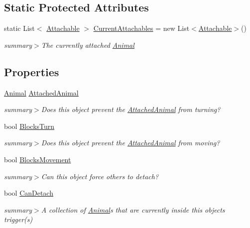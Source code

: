 \subsection*{Static Protected Attributes}
\begin{DoxyCompactItemize}
\item 
static List$<$ \mbox{\hyperlink{class_attachable}{Attachable}} $>$ \mbox{\hyperlink{class_attachable_a0dd1e27d821e792b4ec611836053ea86}{Current\+Attachables}} = new List$<$\mbox{\hyperlink{class_attachable}{Attachable}}$>$()
\begin{DoxyCompactList}\small\item\em summary$>$The currently attached \mbox{\hyperlink{class_animal}{Animal}}\end{DoxyCompactList}\end{DoxyCompactItemize}
\subsection*{Properties}
\begin{DoxyCompactItemize}
\item 
\mbox{\hyperlink{class_animal}{Animal}} \mbox{\hyperlink{class_attachable_a767ba973f26c60f69dd597c9bb3cdf61}{Attached\+Animal}}
\begin{DoxyCompactList}\small\item\em summary$>$Does this object prevent the \mbox{\hyperlink{class_attachable_a767ba973f26c60f69dd597c9bb3cdf61}{Attached\+Animal}} from turning?\end{DoxyCompactList}\item 
bool \mbox{\hyperlink{class_attachable_a57e1cb75b892a9acb9a55c68859d6ced}{Blocks\+Turn}}
\begin{DoxyCompactList}\small\item\em summary$>$Does this object prevent the \mbox{\hyperlink{class_attachable_a767ba973f26c60f69dd597c9bb3cdf61}{Attached\+Animal}} from moving?\end{DoxyCompactList}\item 
bool \mbox{\hyperlink{class_attachable_acfc4ace299ec00b5bdf02bec42a1ba35}{Blocks\+Movement}}
\begin{DoxyCompactList}\small\item\em summary$>$Can this object force others to detach?\end{DoxyCompactList}\item 
bool \mbox{\hyperlink{class_attachable_a569316796ad397c633f321fb40d2dcd8}{Can\+Detach}}
\begin{DoxyCompactList}\small\item\em summary$>$A collection of \mbox{\hyperlink{class_animal}{Animal}}s that are currently inside this object\textquotesingle{}s trigger(s)\end{DoxyCompactList}\end{DoxyCompactItemize}
